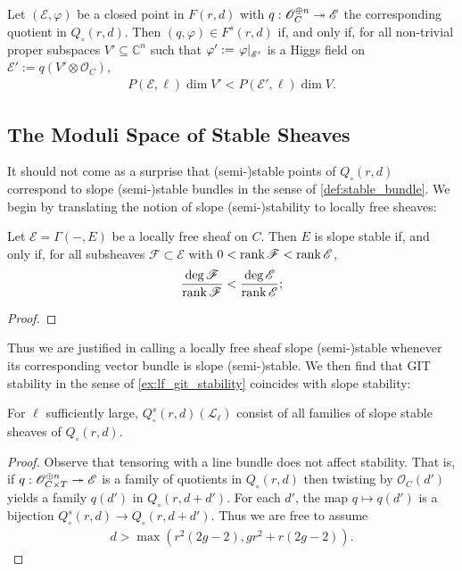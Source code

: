 \documentclass[12pt]{ociamthesis}  %
\begin{document}
\begin{example}
  Let $(\mathscr E,\varphi)$ be a closed point in $F(r,d)$
  with $q:\mathscr O^{\oplus n}_C\twoheadrightarrow\mathscr E$ the corresponding
  quotient in $Q_\circ(r,d)$. Then $(q,\varphi)\in F^s(r,d)$
  if, and only if, for all non-trivial proper subspaces $V'\subseteq\mathbb C^n$
  such that $\varphi' := \left.{\varphi}\right\vert_{\mathscr E'}$ is a Higgs
  field on $\mathscr E' := q(V'\otimes\mathscr O_C)$,
  \begin{align}\label{eq:git_higgs_stable_sheaf}
    P(\mathscr E,\ell)\dim V'< P(\mathscr E',\ell)\dim V.
  \end{align}
  \missingexample
\end{example}

\subsection{The Moduli Space of Stable Sheaves}

It should not come as a surprise that (semi-)stable points of
$Q_\circ(r,d)$ correspond to slope (semi-)stable bundles
in the sense of \ref{def:stable_bundle}.
We begin by translating the notion of slope (semi-)stability to
locally free sheaves:

\begin{lemma}
  Let $\mathscr E=\Gamma(-,E)$ be a locally free sheaf on $C$.
  Then $E$ is slope stable if, and only if, for all subsheaves
  $\mathscr F\subset\mathscr E$ with $0<\operatorname{rank}\mathscr F<\operatorname{rank}\mathscr E$,
  \begin{align}\label{eq:sheaf_slope_stability}
    \frac{\deg\mathscr F}{\operatorname{rank}\mathscr F}<\frac{\deg\mathscr E}{\operatorname{rank}\mathscr E};
  \end{align}
  \begin{proof}
    \missingproof
  \end{proof}
\end{lemma}

Thus we are justified in calling a locally free sheaf slope (semi-)stable
whenever its corresponding vector bundle is slope (semi-)stable. We
then find that GIT stability in the sense of \ref{ex:lf_git_stability}
coincides with slope stability:

\begin{example}\label{thm:stability_of_lf_sheaves}
  For $\ell$ sufficiently large, $Q^s_\circ(r,d)(\mathscr L_\ell)$
  consist of all families of  slope stable sheaves of $Q_\circ(r,d)$.
  \begin{proof}
    Observe that tensoring with a line bundle does not affect
    stability. That is, if $q:\mathscr O^{\oplus n}_{C\times T} \twoheadrightarrow \mathscr E$
    is a family of quotients in $Q_\circ(r,d)$ then twisting by
    $\mathscr O_C(d')$ yields a family $q(d')$ in $Q_\circ(r,d+d')$.
    For each $d'$, the map $q \mapsto q(d')$ is a bijection
    $Q^s_\circ(r,d)\to Q_\circ(r,d+d')$. Thus we are free to
    assume
    \begin{align*}
      d > \max(r^2(2g-2), gr^2 + r(2g-2)).
    \end{align*}
    \missingproof
  \end{proof}
\end{example}
\end{document}
